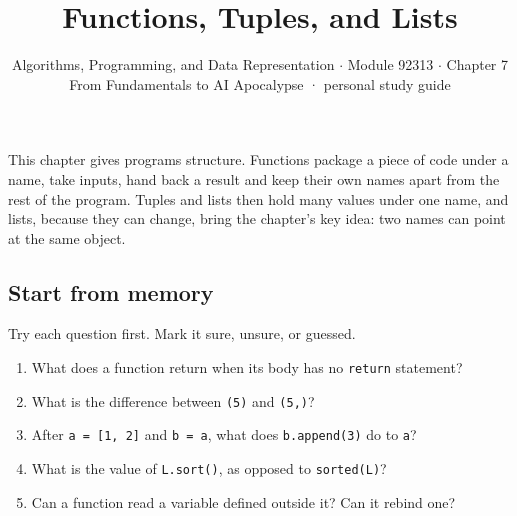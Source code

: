 \documentclass[11pt]{article}
\title{\sffamily\bfseries\color{FAUblue}Functions, Tuples, and Lists}
\author{Algorithms, Programming, and Data Representation \ensuremath{\cdot} Module 92313 \ensuremath{\cdot} Chapter 7\\[2pt]\small From Fundamentals to AI Apocalypse · personal study guide}
\date{}
\begin{document}
\maketitle
\begingroup\footnotesize\setlength{\parskip}{0pt}\tableofcontents\endgroup
\clearpage

{\large This chapter gives programs structure. Functions package a piece of code under a name, take inputs, hand back a result and keep their own names apart from the rest of the program. Tuples and lists then hold many values under one name, and lists, because they can change, bring the chapter’s key idea: two names can point at the same object.}


\begin{keepsection}
\section{Start from memory}

Try each question first. Mark it sure, unsure, or guessed.

\begin{enumerate}
\item What does a function return when its body has no \texttt{return} statement?
\item What is the difference between \texttt{(5)} and \texttt{(5,)}?
\item After \texttt{a = [1, 2]} and \texttt{b = a}, what does \texttt{b.append(3)} do to \texttt{a}?
\item What is the value of \texttt{L.sort()}, as opposed to \texttt{sorted(L)}?
\item Can a function read a variable defined outside it? Can it rebind one?
\end{enumerate}

\end{keepsection}
\end{document}
